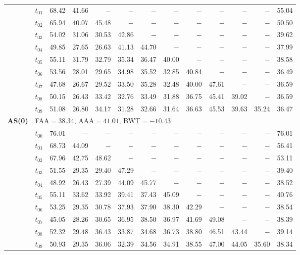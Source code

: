 \begin{table}[ht]
\begin{tabular}{@{}l l r r r r r r r r r r r@{}}
 & $t_{01}$ & 68.42 & 41.66 & $-$ & $-$ & $-$ & $-$ & $-$ & $-$ & $-$ & $-$ & 55.04 \\
 & $t_{02}$ & 65.94 & 40.07 & 45.48 & $-$ & $-$ & $-$ & $-$ & $-$ & $-$ & $-$ & 50.50 \\
 & $t_{03}$ & 54.02 & 31.06 & 30.53 & 42.86 & $-$ & $-$ & $-$ & $-$ & $-$ & $-$ & 39.62 \\
 & $t_{04}$ & 49.85 & 27.65 & 26.63 & 41.13 & 44.70 & $-$ & $-$ & $-$ & $-$ & $-$ & 37.99 \\
 & $t_{05}$ & 55.11 & 31.79 & 32.79 & 35.34 & 36.47 & 40.00 & $-$ & $-$ & $-$ & $-$ & 38.58 \\
 & $t_{06}$ & 53.56 & 28.01 & 29.65 & 34.98 & 35.52 & 32.85 & 40.84 & $-$ & $-$ & $-$ & 36.49 \\
 & $t_{07}$ & 47.68 & 26.67 & 29.52 & 33.50 & 35.28 & 32.48 & 40.00 & 47.61 & $-$ & $-$ & 36.59 \\
 & $t_{08}$ & 50.15 & 26.43 & 33.42 & 32.76 & 33.49 & 31.88 & 36.75 & 45.41 & 39.02 & $-$ & 36.59 \\
 & $t_{09}$ & 51.08 & 26.80 & 34.17 & 31.28 & 32.66 & 31.64 & 36.63 & 45.53 & 39.63 & 35.24 & 36.47 \\
\midrule
\multirow{11}{*}{\textbf{AS(0)}} & \multicolumn{12}{l}{\quad\small FAA$=38.34$,\; AAA$=41.01$,\; BWT$=-10.43$} \\
 & $t_{00}$ & 76.01 & $-$ & $-$ & $-$ & $-$ & $-$ & $-$ & $-$ & $-$ & $-$ & 76.01 \\
 & $t_{01}$ & 68.73 & 44.09 & $-$ & $-$ & $-$ & $-$ & $-$ & $-$ & $-$ & $-$ & 56.41 \\
 & $t_{02}$ & 67.96 & 42.75 & 48.62 & $-$ & $-$ & $-$ & $-$ & $-$ & $-$ & $-$ & 53.11 \\
 & $t_{03}$ & 51.55 & 29.35 & 29.40 & 47.29 & $-$ & $-$ & $-$ & $-$ & $-$ & $-$ & 39.40 \\
 & $t_{04}$ & 48.92 & 26.43 & 27.39 & 44.09 & 45.77 & $-$ & $-$ & $-$ & $-$ & $-$ & 38.52 \\
 & $t_{05}$ & 55.11 & 33.62 & 33.92 & 39.41 & 37.43 & 45.09 & $-$ & $-$ & $-$ & $-$ & 40.76 \\
 & $t_{06}$ & 53.25 & 29.35 & 30.78 & 37.93 & 37.90 & 38.30 & 42.29 & $-$ & $-$ & $-$ & 38.54 \\
 & $t_{07}$ & 45.05 & 28.26 & 30.65 & 36.95 & 38.50 & 36.97 & 41.69 & 49.08 & $-$ & $-$ & 38.39 \\
 & $t_{08}$ & 52.32 & 29.48 & 36.43 & 33.87 & 34.68 & 36.73 & 38.80 & 46.51 & 43.44 & $-$ & 39.14 \\
 & $t_{09}$ & 50.93 & 29.35 & 36.06 & 32.39 & 34.56 & 34.91 & 38.55 & 47.00 & 44.05 & 35.60 & 38.34 \\

\end{tabular}
\end{table}
